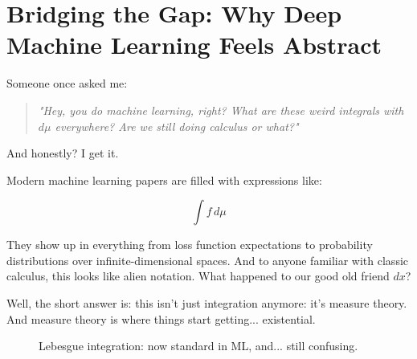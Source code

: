 \section{Bridging the Gap: Why Deep Machine Learning Feels Abstract}  

Someone once asked me:

\begin{quote}
\textit{"Hey, you do machine learning, right? What are these weird integrals with $d\mu$ everywhere? Are we still doing calculus or what?"}
\end{quote}

And honestly? I get it.

Modern machine learning papers are filled with expressions like:

\[
\int f \, d\mu
\]

They show up in everything from loss function expectations to probability distributions over infinite-dimensional spaces. And to anyone familiar with classic calculus, this looks like alien notation. What happened to our good old friend \( dx \)?

Well, the short answer is: this isn’t just integration anymore: it’s measure theory. And measure theory is where things start getting... existential. 

\begin{figure}[H]
\centering
{}
\caption{Lebesgue integration: now standard in ML, and... still confusing.}
\end{figure}

